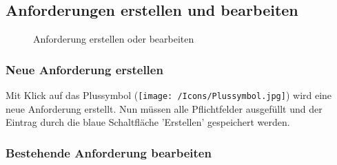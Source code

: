 \begin{figure}[H]
\end{figure}

\subsection{Anforderungen erstellen und bearbeiten}
\label{bkm:Ref2018071810}

\begin{figure}[H]
\caption{Anforderung erstellen oder bearbeiten}
\end{figure}

\subsubsection{Neue Anforderung erstellen}

Mit Klick auf das Plussymbol (\texttt{[image: /Icons/Plussymbol.jpg]})  wird eine neue Anforderung erstellt. Nun müssen alle Pflichtfelder ausgefüllt und der Eintrag durch die blaue Schaltfläche 'Erstellen' gespeichert werden. 

\subsubsection{Bestehende Anforderung bearbeiten}

